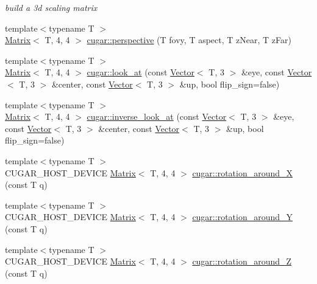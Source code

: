 \begin{DoxyCompactItemize}
\begin{DoxyCompactList}\small\item\em build a 3d scaling matrix \end{DoxyCompactList}\item 
{\footnotesize template$<$typename T $>$ }\\\hyperlink{structcugar_1_1_matrix}{Matrix}$<$ T, 4, 4 $>$ \hyperlink{group___matrices_module_ga790ca51701b1449de8eab83893034637}{cugar\+::perspective} (T fovy, T aspect, T z\+Near, T z\+Far)
\item 
{\footnotesize template$<$typename T $>$ }\\\hyperlink{structcugar_1_1_matrix}{Matrix}$<$ T, 4, 4 $>$ \hyperlink{group___matrices_module_gac6ae11f2364374a0f668719e4aa2e125}{cugar\+::look\+\_\+at} (const \hyperlink{structcugar_1_1_vector}{Vector}$<$ T, 3 $>$ \&eye, const \hyperlink{structcugar_1_1_vector}{Vector}$<$ T, 3 $>$ \&center, const \hyperlink{structcugar_1_1_vector}{Vector}$<$ T, 3 $>$ \&up, bool flip\+\_\+sign=false)
\item 
{\footnotesize template$<$typename T $>$ }\\\hyperlink{structcugar_1_1_matrix}{Matrix}$<$ T, 4, 4 $>$ \hyperlink{group___matrices_module_gac14726d6904fc9bad43cf33757e9fcaa}{cugar\+::inverse\+\_\+look\+\_\+at} (const \hyperlink{structcugar_1_1_vector}{Vector}$<$ T, 3 $>$ \&eye, const \hyperlink{structcugar_1_1_vector}{Vector}$<$ T, 3 $>$ \&center, const \hyperlink{structcugar_1_1_vector}{Vector}$<$ T, 3 $>$ \&up, bool flip\+\_\+sign=false)
\item 
{\footnotesize template$<$typename T $>$ }\\C\+U\+G\+A\+R\+\_\+\+H\+O\+S\+T\+\_\+\+D\+E\+V\+I\+CE \hyperlink{structcugar_1_1_matrix}{Matrix}$<$ T, 4, 4 $>$ \hyperlink{group___matrices_module_ga96490d5b84762c163e1420ec687b548e}{cugar\+::rotation\+\_\+around\+\_\+X} (const T q)
\item 
{\footnotesize template$<$typename T $>$ }\\C\+U\+G\+A\+R\+\_\+\+H\+O\+S\+T\+\_\+\+D\+E\+V\+I\+CE \hyperlink{structcugar_1_1_matrix}{Matrix}$<$ T, 4, 4 $>$ \hyperlink{group___matrices_module_gae9bd2299be5c9fabb44c201f74daac31}{cugar\+::rotation\+\_\+around\+\_\+Y} (const T q)
\item 
{\footnotesize template$<$typename T $>$ }\\C\+U\+G\+A\+R\+\_\+\+H\+O\+S\+T\+\_\+\+D\+E\+V\+I\+CE \hyperlink{structcugar_1_1_matrix}{Matrix}$<$ T, 4, 4 $>$ \hyperlink{group___matrices_module_ga51992445e107a4f8fcc79ce8c52a2fdd}{cugar\+::rotation\+\_\+around\+\_\+Z} (const T q)

\end{DoxyCompactItemize}
